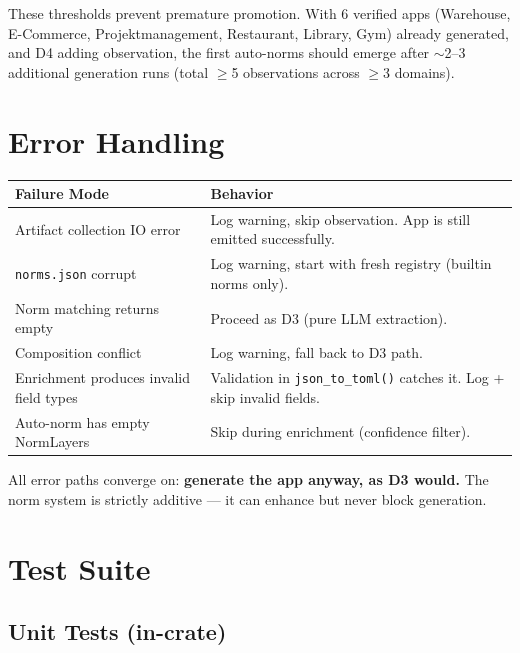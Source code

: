 \documentclass[11pt,a4paper]{article}
\begin{document}
These thresholds prevent premature promotion. With 6 verified apps 
(Warehouse, E-Commerce, Projektmanagement, Restaurant, Library, Gym) 
already generated, and D4 adding observation, the first auto-norms 
should emerge after $\sim$2--3 additional generation runs (total 
$\geq$5 observations across $\geq$3 domains).


\section{Error Handling}

\begin{longtable}{lp{10cm}}
\toprule
\textbf{Failure Mode} & \textbf{Behavior} \\
\midrule
Artifact collection IO error & Log warning, skip observation. 
  App is still emitted successfully. \\
\texttt{norms.json} corrupt & Log warning, start with fresh 
  registry (builtin norms only). \\
Norm matching returns empty & Proceed as D3 (pure LLM extraction). \\
Composition conflict & Log warning, fall back to D3 path. \\
Enrichment produces invalid field types & Validation in 
  \texttt{json\_to\_toml()} catches it. Log + skip invalid fields. \\
Auto-norm has empty NormLayers & Skip during enrichment 
  (confidence filter). \\
\bottomrule
\end{longtable}

All error paths converge on: \textbf{generate the app anyway, as D3 
would.} The norm system is strictly additive --- it can enhance but 
never block generation.


\section{Test Suite}

\subsection{Unit Tests (in-crate)}
\end{document}
